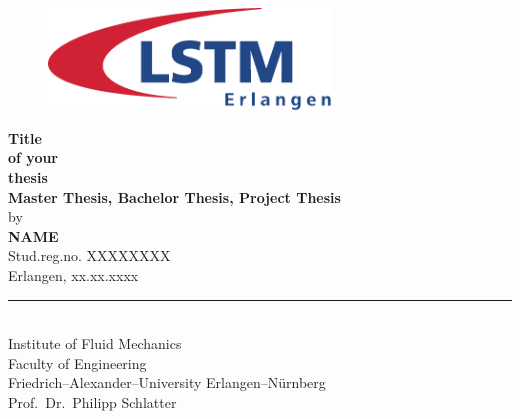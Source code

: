 \documentclass[
 	11pt,                 				%
  	notitlepage,          				%
  	twoside, 			   				%
 	bibliography=totoc,
  	listof=totoc,
  	headsepline,         				%
  	footsepline,         				%
  cleardoublepage=empty,				%
  numbers=noenddot,
]{scrreprt}
\begin{document}
%


\pagestyle{empty}






\begin{titlepage}
	\begin{center}


\begin{figure}[htbp]
	\centering
		\includegraphics[width=75mm]{bilder/LSTM_Logo.pdf} 		
\end{figure}
		\ifenglish
		\vspace{25mm}
		 		
		\LARGE {\textbf{Title \\ of your \\ thesis}}\\ [25mm]
		\huge {\textbf{Master Thesis, Bachelor Thesis, Project Thesis}} \\ [14mm]
		 by \\ [2mm]
		\LARGE \textbf{NAME}\\[5mm]
		\LARGE Stud.reg.no. XXXXXXXX\\[5mm]
		\LARGE Erlangen, xx.xx.xxxx\\
		\vfill
		\rule{15cm}{0.02mm}\\
		\Large Institute of Fluid Mechanics\\
		Faculty of Engineering\\
		Friedrich--Alexander--University Erlangen--N\"urnberg\\
		Prof.\ Dr.\ Philipp Schlatter\\
		\else
		
		\vspace{25mm}
		

\end{center}
\end{titlepage}
\end{document}
